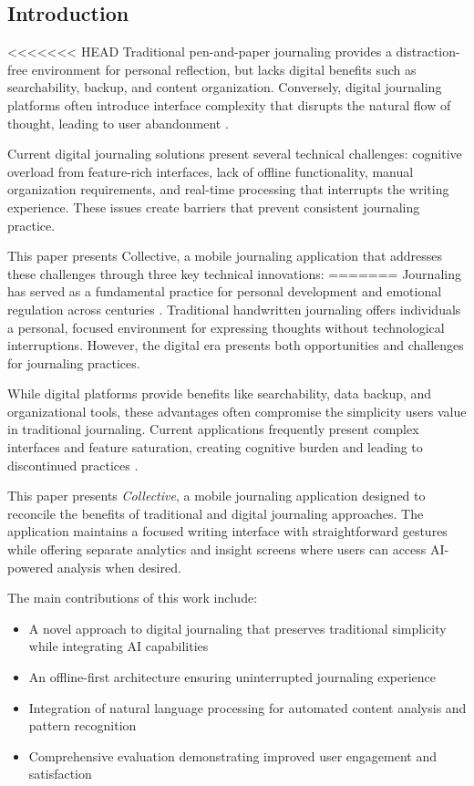 \documentclass[conference]{IEEEtran}
\begin{document}
{\begin{IEEEkeywords}
\thispagestyle{firstpagefooter}

\section{Introduction}

<<<<<<< HEAD
Traditional pen-and-paper journaling provides a distraction-free environment for personal reflection, but lacks digital benefits such as searchability, backup, and content organization. Conversely, digital journaling platforms often introduce interface complexity that disrupts the natural flow of thought, leading to user abandonment \cite{pennebaker1999forming}.

Current digital journaling solutions present several technical challenges: cognitive overload from feature-rich interfaces, lack of offline functionality, manual organization requirements, and real-time processing that interrupts the writing experience. These issues create barriers that prevent consistent journaling practice.

This paper presents Collective, a mobile journaling application that addresses these challenges through three key technical innovations:
=======
Journaling has served as a fundamental practice for personal development and emotional regulation across centuries \cite{pennebaker1999forming}. Traditional handwritten journaling offers individuals a personal, focused environment for expressing thoughts without technological interruptions. However, the digital era presents both opportunities and challenges for journaling practices.

While digital platforms provide benefits like searchability, data backup, and organizational tools, these advantages often compromise the simplicity users value in traditional journaling. Current applications frequently present complex interfaces and feature saturation, creating cognitive burden and leading to discontinued practices \cite{sweller1988cognitive}.

This paper presents \textit{Collective}, a mobile journaling application designed to reconcile the benefits of traditional and digital journaling approaches. The application maintains a focused writing interface with straightforward gestures while offering separate analytics and insight screens where users can access AI-powered analysis when desired.

The main contributions of this work include:
\begin{itemize}
\item A novel approach to digital journaling that preserves traditional simplicity while integrating AI capabilities
\item An offline-first architecture ensuring uninterrupted journaling experience
\item Integration of natural language processing for automated content analysis and pattern recognition
\item Comprehensive evaluation demonstrating improved user engagement and satisfaction
\end{itemize}


\end{IEEEkeywords}}
\end{document}
